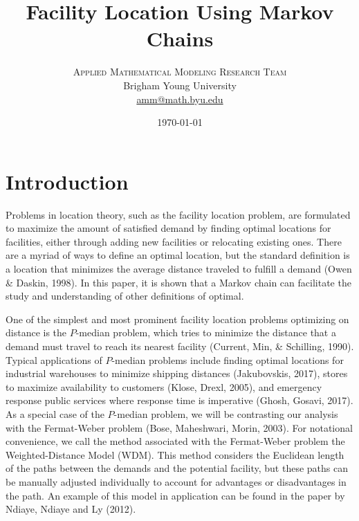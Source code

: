 \documentclass[twoside,twocolumn]{article}
\title{Facility Location Using Markov Chains}
\author{
\textsc{Applied Mathematical Modeling Research Team}\\[1ex]
\normalsize Brigham Young University \\
\normalsize \href{mailto:amm@math.byu.edu}{amm@math.byu.edu}
}
\date{\today}
\begin{document}
\maketitle

\section{Introduction}

Problems in location theory, such as the facility location problem, are formulated to maximize the amount of satisfied demand by finding optimal locations for facilities, either through adding new facilities or relocating existing ones.
There are a myriad of ways to define an optimal location, but the standard definition is a location that minimizes the average distance traveled to fulfill a demand (Owen \& Daskin, 1998).
In this paper, it is shown that a Markov chain can facilitate the study and understanding of other definitions of optimal.


One of the simplest and most prominent facility location problems optimizing on distance is the $P$-median problem, which tries to minimize the distance that a demand must travel to reach its nearest facility (Current, Min, \& Schilling, 1990). %
Typical applications of $P$-median problems include finding optimal locations for industrial warehouses to minimize shipping distances (Jakubovskis, 2017), stores to maximize availability to customers (Klose, Drexl, 2005), and emergency response public services where response time is imperative (Ghosh, Gosavi, 2017).
As a special case of the $P$-median problem, we will be contrasting our analysis with the Fermat-Weber problem (Bose, Maheshwari, Morin, 2003). 
For notational convenience, we call the method associated with the Fermat-Weber problem the Weighted-Distance Model (WDM). %
This method considers the Euclidean length of the paths between the demands and the potential facility, but these paths can be manually adjusted individually to account for advantages or disadvantages in the path. %
An example of this model in application can be found in the paper by Ndiaye, Ndiaye and Ly (2012). %
\end{document}
